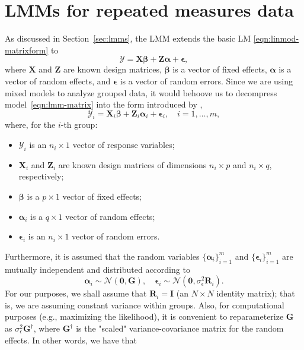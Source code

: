 \documentclass[cmfont,usenames,dvipsnames,leqno]{afit-etd}\usepackage[]{graphicx}\usepackage[]{color}
\newcommand{\bc}[1]{\ensuremath{\bm{\mathcal{#1}}}}
\newcommand{\mc}[1]{\ensuremath{\mathcal{#1}}}
\newcommand{\X}{\ensuremath{\bm{X}}}
\newcommand{\Z}{\ensuremath{\bm{Z}}}
\begin{document}
\section{LMMs for repeated measures data}
\label{sec:calibration-lmm-introduction}
As discussed in Section~\ref{sec:lmms}, the LMM extends the basic LM \eqref{eqn:linmod-matrixform} to 
\begin{equation}
\label{eqn:lmm-matrix}
  \bc{Y} = \X\bm{\beta} + \Z\bm{\alpha} + \bm{\epsilon},
\end{equation}
where $\X$ and $\Z$ are known design matrices, $\bm{\beta}$ is a vector of fixed effects, $\bm{\alpha}$ is a vector of random effects, and $\bm{\epsilon}$ is a vector of random errors. Since we are using mixed models to analyze grouped data, it would behoove us to decompress model~\eqref{eqn:lmm-matrix} into the form introduced by \citet{laird_random_1982},
\begin{equation}
\label{eqn:lmm-laird-ware}
  \bc{Y}_i = \X_i\bm{\beta} + \Z_i\bm{\alpha}_i + \bm{\epsilon}_i, \quad i = 1, \dotsc, m,
\end{equation}
where, for the $i$-th group:
\begin{itemize}
  \item $\bc{Y}_i$ is an $n_i \times 1$ vector of response variables;
  \item $\X_i$ and $\Z_i$ are known design matrices of dimensions $n_i \times p$ and $n_i \times q$, respectively;
  \item $\bm{\beta}$ is a $p \times 1$ vector of fixed effects;
  \item $\bm{\alpha}_i$ is a $q \times 1$ vector of random effects;
  \item $\bm{\epsilon}_i$ is an $n_i \times 1$ vector of random errors.
\end{itemize}
Furthermore, it is assumed that the random variables $\big\{\bm{\alpha}_i\big\}_{i=1}^m$ and $\big\{\bm{\epsilon}_i\big\}_{i=1}^m$ are mutually independent and distributed according to
\begin{equation*}
  \bm{\alpha}_i \sim \mc{N}\left(\bm{0}, \bm{G}\right), \quad
  \bm{\epsilon}_i \sim \mc{N}\left(\bm{0}, \sigma_\epsilon^2\bm{R}_i\right).
\end{equation*}
For our purposes, we shall assume that $\bm{R}_i = \bm{I}$ (an $N \times N$ identity matrix); that is, we are assuming constant variance within groups. Also, for computational purposes (e.g., maximizing the likelihood), it is convenient to reparameterize $\bm{G}$ as $\sigma_\epsilon^2\bm{G}^\dagger$, where $\bm{G}^\dagger$ is the "scaled" variance-covariance matrix for the random effects. In other words, we have that
\end{document}
